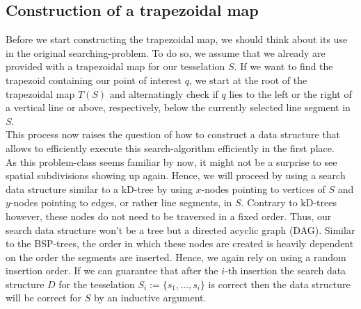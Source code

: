     \subsection{Construction of a trapezoidal map}
        Before we start constructing the trapezoidal map, we should think about its use in the original searching-problem. To do so, we assume that we already are provided with a trapezoidal map for our tesselation $S$. If we want to find the trapezoid containing our point of interest $q$, we start at the root of the trapezoidal map $T(S)$ and alternatingly check if $q$ lies to the left or the right of a vertical line or above, respectively, below the currently selected line segment in $S$. \\
        This process now raises the question of how to construct a data structure that allows to efficiently execute this search-algorithm efficiently in the first place. \\
        As this problem-class seems familiar by now, it might not be a surprise to see spatial subdivisions showing up again. Hence, we will proceed by using a search data structure similar to a kD-tree by using $x$-nodes pointing to vertices of $S$ and $y$-nodes pointing to edges, or rather line segments, in $S$. Contrary to kD-trees however, these nodes do not need to be traversed in a fixed order. Thus, our search data structure won't be a tree but a directed acyclic graph (DAG). Similar to the BSP-trees, the order in which these nodes are created is heavily dependent on the order the segments are inserted. Hence, we again rely on using a random insertion order. If we can guarantee that after the $i$-th insertion the search data structure $D$ for the tesselation $S_i := \{s_1, \dots, s_i \}$ is correct then the data structure will be correct for $S$ by an inductive argument. 

